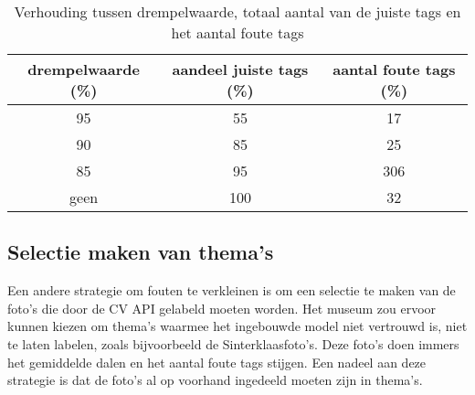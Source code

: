 \begin{table}
    \renewcommand\arraystretch{1.2}
    \centering
	\begin{tabular}{*{3}{c}}
		\toprule
		drempelwaarde (\%) & aandeel juiste tags (\%) & aantal foute tags (\%) \\
        \midrule
		95 & 55 & 17 \\
        [\smallskipamount]
		90 & 85 & 25 \\
        [\smallskipamount]
		85 & 95 & 306 \\
        [\smallskipamount]
		geen & 100 & 32 \\
		\bottomrule
	\end{tabular}
	\caption{Verhouding tussen drempelwaarde, totaal aantal van de juiste tags en het aantal foute tags}
	\label{tab:instellen-drempelwaarde}
\end{table}

\subsection{Selectie maken van thema’s}

Een andere strategie om fouten te verkleinen is om een selectie te maken van de foto’s die door de CV API gelabeld moeten worden. Het museum zou ervoor kunnen kiezen om thema’s waarmee het ingebouwde model niet vertrouwd is, niet te laten labelen, zoals bijvoorbeeld de Sinterklaasfoto’s. Deze foto’s doen immers het gemiddelde dalen en het aantal foute tags stijgen. Een nadeel aan deze strategie is dat de foto’s al op voorhand ingedeeld moeten zijn in thema’s.